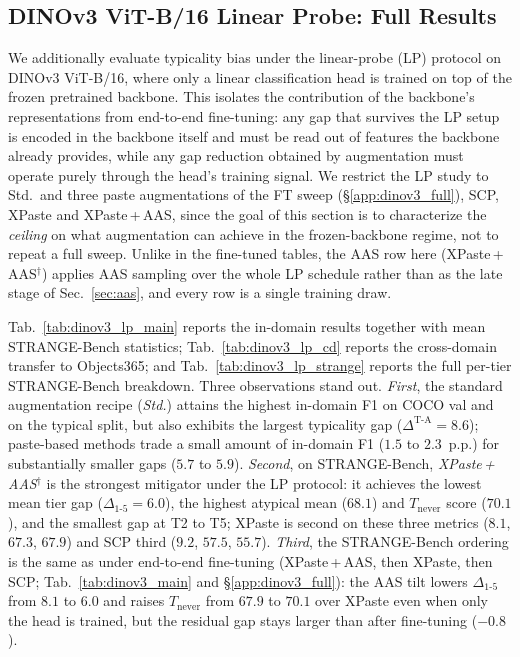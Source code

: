 \subsection{DINOv3 ViT-B/16 Linear Probe: Full Results}
\label{app:dinov3_lp}

We additionally evaluate typicality bias under the linear-probe (LP) protocol on DINOv3 ViT-B/16, where only a linear classification head is trained on top of the frozen pretrained backbone. This isolates the contribution of the backbone's representations from end-to-end fine-tuning: any gap that survives the LP setup is encoded in the backbone itself and must be read out of features the backbone already provides, while any gap reduction obtained by augmentation must operate purely through the head's training signal. We restrict the LP study to Std.\ and three paste augmentations of the FT sweep (\S\ref{app:dinov3_full}), SCP, XPaste and XPaste\,+\,AAS, since the goal of this section is to characterize the \emph{ceiling} on what augmentation can achieve in the frozen-backbone regime, not to repeat a full sweep. Unlike in the fine-tuned tables, the AAS row here (XPaste\,+\,AAS$^{\dagger}$) applies AAS sampling over the whole LP schedule rather than as the late stage of Sec.~\ref{sec:aas}, and every row is a single training draw. 

Tab.~\ref{tab:dinov3_lp_main} reports the in-domain results together with mean STRANGE-Bench statistics;  Tab.~\ref{tab:dinov3_lp_cd} reports the cross-domain transfer to Objects365; and Tab.~\ref{tab:dinov3_lp_strange} reports the full per-tier STRANGE-Bench breakdown. Three observations stand out. \emph{First}, the standard augmentation recipe (\emph{Std.}) attains the highest in-domain F1 on COCO val and on the typical split, but also exhibits the largest typicality gap ($\Delta^{\text{T-A}} = 8.6$); paste-based methods trade a small amount of in-domain F1 ($1.5$ to $2.3$~p.p.\@) for substantially smaller gaps ($5.7$ to $5.9$). \emph{Second}, on STRANGE-Bench, \emph{XPaste\,+\,AAS$^{\dagger}$} is the strongest mitigator under the LP protocol: it achieves the lowest mean tier gap ($\Delta_{1\text{-}5} = 6.0$), the highest atypical mean ($68.1$) and $T_{\text{never}}$ score ($70.1$), and the smallest gap at T2 to T5; XPaste is second on these three metrics ($8.1$, $67.3$, $67.9$) and SCP third ($9.2$, $57.5$, $55.7$). \emph{Third}, the STRANGE-Bench ordering is the same as under end-to-end fine-tuning (XPaste\,+\,AAS, then XPaste, then SCP; Tab.~\ref{tab:dinov3_main} and \S\ref{app:dinov3_full}): the AAS tilt lowers $\Delta_{1\text{-}5}$ from $8.1$ to $6.0$ and raises $T_{\text{never}}$ from $67.9$ to $70.1$ over XPaste even when only the head is trained, but the residual gap stays larger than after fine-tuning ($-0.8$).

